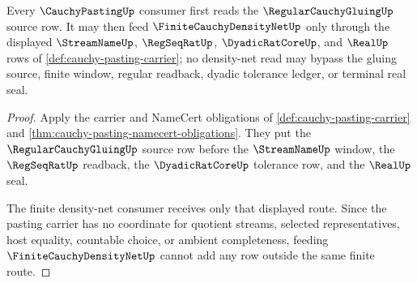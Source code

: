 \begin{theorem}
\label{thm:cauchy-pasting-regular-gluing-density-route}
Every $\CauchyPastingUp$ consumer first reads the $\RegularCauchyGluingUp$ source row. It may then feed $\FiniteCauchyDensityNetUp$ only through the displayed $\StreamNameUp$, $\RegSeqRatUp$, $\DyadicRatCoreUp$, and $\RealUp$ rows of \autoref{def:cauchy-pasting-carrier}; no density-net read may bypass the gluing source, finite window, regular readback, dyadic tolerance ledger, or terminal real seal.
\end{theorem}
\begin{proof}
Apply the carrier and NameCert obligations of \autoref{def:cauchy-pasting-carrier} and \autoref{thm:cauchy-pasting-namecert-obligations}. They put the $\RegularCauchyGluingUp$ source row before the $\StreamNameUp$ window, the $\RegSeqRatUp$ readback, the $\DyadicRatCoreUp$ tolerance row, and the $\RealUp$ seal.

The finite density-net consumer receives only that displayed route. Since the pasting carrier has no coordinate for quotient streams, selected representatives, host equality, countable choice, or ambient completeness, feeding $\FiniteCauchyDensityNetUp$ cannot add any row outside the same finite route.
\end{proof}
